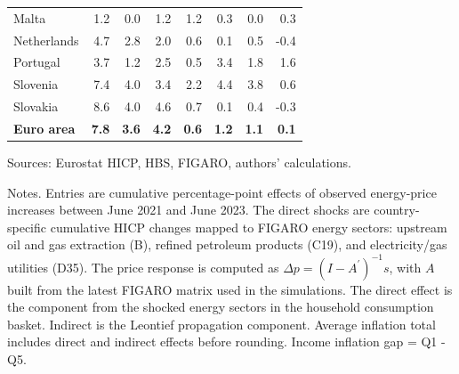 \documentclass[11pt]{article}
\begin{document}
\begin{table}[H]
\begin{tabular}{lrrrrrrr}
Malta & 1.2 & 0.0 & 1.2 & 1.2 & 0.3 & 0.0 & 0.3
 \\
Netherlands & 4.7 & 2.8 & 2.0 & 0.6 & 0.1 & 0.5 & -0.4
 \\
Portugal & 3.7 & 1.2 & 2.5 & 0.5 & 3.4 & 1.8 & 1.6
 \\
Slovenia & 7.4 & 4.0 & 3.4 & 2.2 & 4.4 & 3.8 & 0.6
 \\
Slovakia & 8.6 & 4.0 & 4.6 & 0.7 & 0.1 & 0.4 & -0.3
 \\
\midrule
\textbf{Euro area} & \textbf{7.8} & \textbf{3.6} & \textbf{4.2} & \textbf{0.6} & \textbf{1.2} & \textbf{1.1} & \textbf{0.1}
 \\
\bottomrule
\end{tabular}
\par\vspace{0.35em}\footnotesize\noindent Sources: Eurostat HICP, HBS, FIGARO, authors' calculations.
\par\vspace{0.25em}\footnotesize\noindent Notes. Entries are cumulative percentage-point effects of observed energy-price increases between June 2021 and June 2023. The direct shocks are country-specific cumulative HICP changes mapped to FIGARO energy sectors: upstream oil and gas extraction (B), refined petroleum products (C19), and electricity/gas utilities (D35). The price response is computed as $\Delta p = (I - A^{\prime})^{-1}s$, with $A$ built from the latest FIGARO matrix used in the simulations. The direct effect is the component from the shocked energy sectors in the household consumption basket. Indirect is the Leontief propagation component. Average inflation total includes direct and indirect effects before rounding. Income inflation gap = Q1 - Q5.
\end{table}
\vspace{0.6em}
\end{document}
